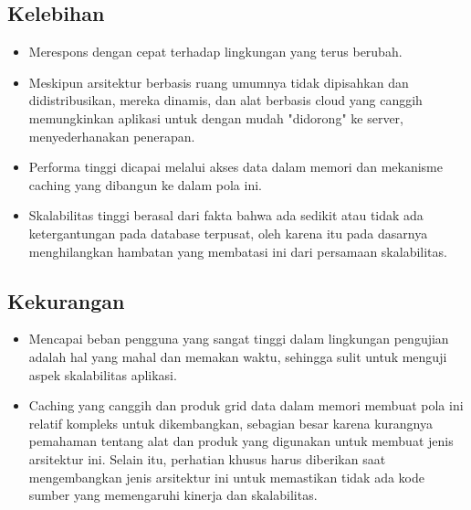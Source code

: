 \subsection{{Kelebihan}}
\begin{itemize}
	\item  Merespons dengan cepat terhadap lingkungan yang terus berubah.
	\item  Meskipun arsitektur berbasis ruang umumnya tidak dipisahkan dan didistribusikan, mereka dinamis, dan alat berbasis cloud yang canggih memungkinkan aplikasi untuk dengan mudah "didorong" ke server, menyederhanakan penerapan.
	\item  Performa tinggi dicapai melalui akses data dalam memori dan mekanisme caching yang dibangun ke dalam pola ini.
	\item  Skalabilitas tinggi berasal dari fakta bahwa ada sedikit atau tidak ada ketergantungan pada database terpusat, oleh karena itu pada dasarnya menghilangkan hambatan yang membatasi ini dari persamaan skalabilitas.
\end{itemize} 
\subsection{{Kekurangan}}
\begin{itemize}
	\item  Mencapai beban pengguna yang sangat tinggi dalam lingkungan pengujian adalah hal yang mahal dan memakan waktu, sehingga sulit untuk menguji aspek skalabilitas aplikasi.
	\item  Caching yang canggih dan produk grid data dalam memori membuat pola ini relatif kompleks untuk dikembangkan, sebagian besar karena kurangnya pemahaman tentang alat dan produk yang digunakan untuk membuat jenis arsitektur ini. Selain itu, perhatian khusus harus diberikan saat mengembangkan jenis arsitektur ini untuk memastikan tidak ada kode sumber yang memengaruhi kinerja dan skalabilitas.
\end{itemize}
